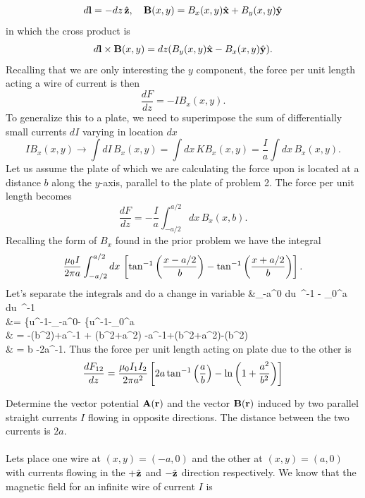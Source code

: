 \documentclass[11pt,letterpaper]{article}
\begin{document}
	\[
		d\mathbf{l} = -dz\,  \hat{\mathbf{z}},\quad \mathbf{B}(x,y) = B_x(x,y)\hat{\mathbf{x}}+B_y(x,y)\hat{\mathbf{y}}
	\]
	in which the cross product is
	\[
		d\mathbf{l} \times \mathbf{B}(x,y) = dz(B_y(x,y)\hat{\mathbf{x}}-B_x(x,y)\hat{\mathbf{y}}).
	\]
	Recalling that we are only interesting the $y$ component, the force per unit length acting a wire of current is then
	\[
		\frac{dF}{dz} = -IB_x(x,y).
	\]
	To generalize this to a plate, we need to superimpose the sum of differentially small currents $dI$ varying in location $dx$
	\[
		IB_x(x,y) \to \int dI\, B_x(x,y)  = \int dx\, K B_x(x,y) = \frac{I}{a}\int dx\, B_x(x,y) .
	\]
	Let us assume the plate of which we are calculating the force upon is located at a distance $b$ along the $y$-axis, parallel to the plate
	of problem 2. The force per unit length becomes
	\[
		\frac{dF}{dz} = -\frac{I}{a} \int_{-a/2}^{a/2} dx\, B_x(x,b).
	\]
	Recalling the form of $B_x$ found in the prior problem we have the integral
	\[
		\frac{\mu_0 I}{2\pi a} \int _{-a/2}^{a/2}dx\, \left[\tan^{-1}\left(\frac{x-a/2}{b}\right)- \tan^{-1}\left(\frac{x+a/2}{b}\right)\right].
	\]
	Let's separate the integrals and do a change in variable
	\ba
		&\int_{-a}^0 du\, \tan^{-1} - \int_{0}^{a} du\, \tan^{-1} \\
		 &= \left\{u\tan^{-1}-_{-a}^0- 
		\left\{u\tan^{-1}-_{0}^a\\
		& = -\ln(b^2)+a\tan^{-1} + \ln(b^2+a^2)
		-a\tan^{-1}+\ln(b^2+a^2)-\ln(b^2)\\
		& = b\ln{} -2a\tan^{-1}.
	\ea
	Thus the force per unit length acting on plate due to the other is
	\[
		\frac{dF_{12}}{dz}  =  \frac{\mu_0I_1I_2}{2\pi a^2}\left[2a\tan^{-1}\left(\frac{a}{b}\right)-\ln\left(1+\frac{a^2}{b^2}\right)\right]
	\]
	\item
	Determine the vector potential $\mathbf{A}(\mathbf{r})$ and the vector $\mathbf{B}(\mathbf{r})$ induced by two parallel straight currents
	$I$ flowing in opposite directions. The distance between the two currents is $2a$. 
	\\
	\\
	Lets place one wire at $(x,y) = (-a,0)$ and the other at $(x,y) = (a,0)$ with currents flowing in the $+\hat{\mathbf{z}}$ and $-\hat{\mathbf{z}}$ direction
	respectively. We know that the magnetic field for an infinite wire of current $I$ is
\end{document}
